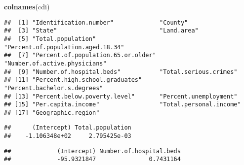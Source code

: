 \documentclass[
]{article}
\newenvironment{Shaded}{\begin{snugshade}}{\end{snugshade}}
\newcommand{\CommentTok}[1]{\textcolor[rgb]{0.56,0.35,0.01}{\textit{#1}}}
\newcommand{\DataTypeTok}[1]{\textcolor[rgb]{0.13,0.29,0.53}{#1}}
\newcommand{\KeywordTok}[1]{\textcolor[rgb]{0.13,0.29,0.53}{\textbf{#1}}}
\newcommand{\NormalTok}[1]{#1}
\newcommand{\OperatorTok}[1]{\textcolor[rgb]{0.81,0.36,0.00}{\textbf{#1}}}
\newcommand{\StringTok}[1]{\textcolor[rgb]{0.31,0.60,0.02}{#1}}
\begin{document}
\begin{Shaded}
\begin{Highlighting}[]
\KeywordTok{colnames}\NormalTok{(cdi)}
\end{Highlighting}
\end{Shaded}

\begin{verbatim}
##  [1] "Identification.number"             "County"                           
##  [3] "State"                             "Land.area"                        
##  [5] "Total.population"                  "Percent.of.population.aged.18.34" 
##  [7] "Percent.of.population.65.or.older" "Number.of.active.physicians"      
##  [9] "Number.of.hospital.beds"           "Total.serious.crimes"             
## [11] "Percent.high.school.graduates"     "Percent.bachelor.s.degrees"       
## [13] "Percent.below.poverty.level"       "Percent.unemployment"             
## [15] "Per.capita.income"                 "Total.personal.income"            
## [17] "Geographic.region"
\end{verbatim}

\begin{Shaded}
\end{Shaded}

\begin{verbatim}
##      (Intercept) Total.population 
##    -1.106348e+02     2.795425e-03
\end{verbatim}

\begin{Shaded}
\end{Shaded}

\begin{verbatim}
##             (Intercept) Number.of.hospital.beds 
##             -95.9321847               0.7431164
\end{verbatim}
\end{document}
